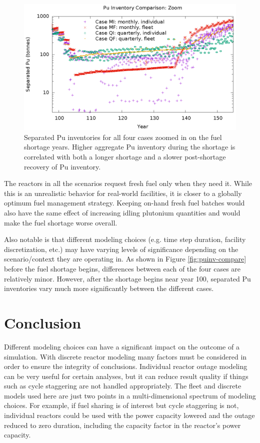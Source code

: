 \documentclass{style}
\begin{document}
\begin{figure}[!h]
    \centering
    \includegraphics[width=1.0\textwidth]{exp2/puinv-compare-zoom.eps}
    \caption{
        Separated Pu inventories for all four cases zoomed in on the fuel
        shortage years.  Higher aggregate Pu inventory  during the shortage is
        correlated with both a longer shortage and a slower post-shortage
        recovery of Pu inventory.
    }
    \label{fig:puinv-compare-zoom}
\end{figure}

The reactors in all the scenarios request fresh fuel only when they need it.
While this is an unrealistic behavior for real-world facilities, it is closer
to a globally optimum fuel management strategy.  Keeping on-hand fresh fuel
batches would also have the same effect of increasing idling plutonium
quantities and would make the fuel shortage worse overall.

Also notable is that different modeling choices (e.g. time step duration,
facility discretization, etc.) may have varying levels of significance
depending on the scenario/context they are operating in.  As shown in Figure
\ref{fig:puinv-compare} before the fuel shortage begins, differences between
each of the four cases are relatively minor.  However, after the shortage
begins near year 100, separated Pu inventories vary much more significantly
between the different cases.

\section{Conclusion}

Different modeling choices can have a significant impact on the outcome of a
simulation.  With discrete reactor modeling many factors must be considered in
order to ensure the integrity of conclusions.  Individual reactor outage
modeling can be very useful for certain analyses, but it can reduce result
quality if things such as cycle staggering are not handled appropriately.  The
fleet and discrete models used here are just two points in a multi-dimensional
spectrum of modeling choices. For example, if fuel sharing is of interest but cycle
staggering is not, individual reactors could be used with the power capacity
lowered and the outage reduced to zero duration, including the capacity factor
in the reactor's power capacity.
\end{document}
